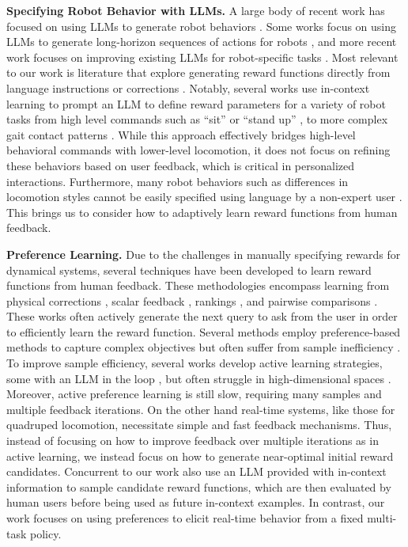 \noindent\textbf{Specifying Robot Behavior with LLMs.} A large body of recent work has focused on using LLMs to generate robot behaviors \cite{liang2023code, brohan2023can, yu2023language, mahadevan2024generative, thumm2024text2interaction, ma2023eureka}. Some works focus on using LLMs to generate long-horizon sequences of actions for robots \cite{brohan2023can, liang2023code}, and more recent work focuses on improving existing LLMs for robot-specific tasks \cite{liang2024learning}. Most relevant to our work is literature that explore generating reward functions directly from language instructions or corrections \cite{kwon2023reward, hu2023language, yu2023language}. Notably, several works use in-context learning to prompt an LLM to define reward parameters for a variety of robot tasks from high level commands such as ``sit'' or ``stand up'' \cite{yu2023language}, to more complex gait contact patterns \cite{tang2023saytap}. 
While this approach effectively bridges high-level behavioral commands with lower-level locomotion, it does not focus on refining these behaviors based on user feedback, which is critical in personalized interactions. 
 Furthermore, many robot behaviors such as differences in locomotion styles cannot be easily specified using language by a non-expert user \cite{casper2023open}. This brings us to consider how to adaptively learn reward functions from human feedback.

\noindent\textbf{Preference Learning.} 
Due to the challenges in manually specifying rewards for dynamical systems, several techniques have been developed to learn reward functions from human feedback. These methodologies encompass learning from 
physical corrections \cite{li2021learning}, scalar feedback \cite{knox2009interactively}, rankings \cite{myers2022learning, brown2019extrapolating}, and pairwise comparisons \cite{hejna2023few, lee2021pebble,sadigh2017active, ziegler1909fine}. 
These works often actively generate the next query to ask from the user in order to efficiently learn the reward function. Several methods employ preference-based methods to capture complex objectives but often suffer from sample inefficiency \cite{lee2021pebble, hejna2023few}. 
To improve sample efficiency, several works develop active learning strategies, some with an LLM in the loop \cite{peng2024preference, mahmud2024maple}, but often struggle in high-dimensional spaces \cite{sadigh2017active, biyik2018batch}. Moreover, active preference learning is still slow, requiring many samples and multiple feedback iterations. On the other hand real-time systems, like those for quadruped locomotion, necessitate simple and fast feedback mechanisms. Thus, instead of focusing on how to improve feedback over multiple iterations as in active learning, we instead focus on how to generate near-optimal initial reward candidates. Concurrent to our work \cite{yu2024few} also use an LLM provided with in-context information to sample candidate reward functions, which are then evaluated by human users before being used as future in-context examples. In contrast, our work focuses on using preferences to elicit real-time behavior from a fixed multi-task policy.

